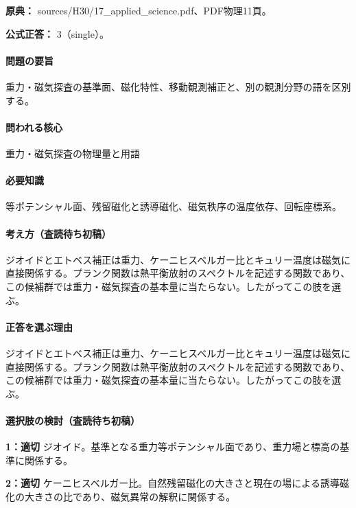\noindent\textbf{原典：} sources/H30/17\_applied\_science.pdf、PDF物理11頁。

\textbf{公式正答：} 3（single）。

\paragraph{問題の要旨} 重力・磁気探査の基準面、磁化特性、移動観測補正と、別の観測分野の語を区別する。

\paragraph{問われる核心} 重力・磁気探査の物理量と用語

\paragraph{必要知識} 等ポテンシャル面、残留磁化と誘導磁化、磁気秩序の温度依存、回転座標系。

\paragraph{考え方（査読待ち初稿）} ジオイドとエトベス補正は重力、ケーニヒスベルガー比とキュリー温度は磁気に直接関係する。プランク関数は熱平衡放射のスペクトルを記述する関数であり、この候補群では重力・磁気探査の基本量に当たらない。したがってこの肢を選ぶ。

\paragraph{正答を選ぶ理由} ジオイドとエトベス補正は重力、ケーニヒスベルガー比とキュリー温度は磁気に直接関係する。プランク関数は熱平衡放射のスペクトルを記述する関数であり、この候補群では重力・磁気探査の基本量に当たらない。したがってこの肢を選ぶ。

\paragraph{選択肢の検討（査読待ち初稿）}\mbox{}\par

\noindent\textbf{1：適切} ジオイド。基準となる重力等ポテンシャル面であり、重力場と標高の基準に関係する。\par

\noindent\textbf{2：適切} ケーニヒスベルガー比。自然残留磁化の大きさと現在の場による誘導磁化の大きさの比であり、磁気異常の解釈に関係する。\par

